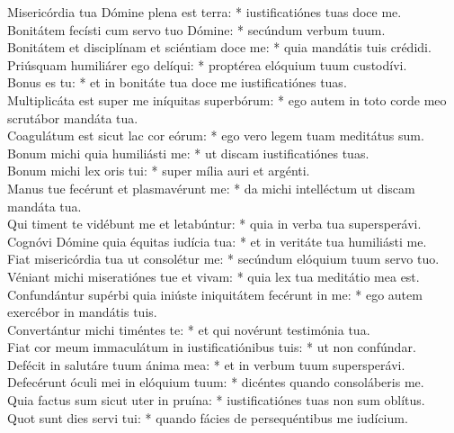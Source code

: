 {	Misericórdia tua Dómine plena est terra: * iustificatiónes tuas doce me. \\
	Bonitátem fecísti cum servo tuo Dómine: * secúndum verbum tuum. \\
	Bonitátem et disciplínam et sciéntiam doce me: * quia mandátis tuis crédidi. \\
	Priúsquam humiliárer ego delíqui: * proptérea elóquium tuum custodívi. \\
	Bonus es tu: * et in bonitáte tua doce me iustificatiónes tuas. \\
	Multiplicáta est super me iníquitas superbórum: * ego autem in toto corde meo scrutábor mandáta tua. \\
	Coagulátum est sicut lac cor eórum: * ego vero legem tuam meditátus sum. \\
	Bonum michi quia humiliásti me: * ut discam iustificatiónes tuas. \\
	Bonum michi lex oris tui: * super mília auri et argénti. \\
	Manus tue fecérunt et plasmavérunt me: * da michi intelléctum ut discam mandáta tua. \\
	Qui timent te vidébunt me et letabúntur: * quia in verba tua supersperávi. \\
	Cognóvi Dómine quia équitas iudícia tua: * et in veritáte tua humiliásti me. \\
	Fiat misericórdia tua ut consolétur me: * secúndum elóquium tuum servo tuo. \\
	Véniant michi miseratiónes tue et vivam: * quia lex tua meditátio mea est. \\
	Confundántur supérbi quia iniúste iniquitátem fecérunt in me: * ego autem exercébor in mandátis tuis. \\
	Convertántur michi timéntes te: * et qui novérunt testimónia tua. \\
	Fiat cor meum immaculátum in iustificatiónibus tuis: * ut non confúndar. \\
	Defécit in salutáre tuum ánima mea: * et in verbum tuum supersperávi. \\
	Defecérunt óculi mei in elóquium tuum: * dicéntes quando consoláberis me. \\
	Quia factus sum sicut uter in pruína: * iustificatiónes tuas non sum oblítus. \\
	Quot sunt dies servi tui: * quando fácies de persequéntibus me iudícium. \\
}
